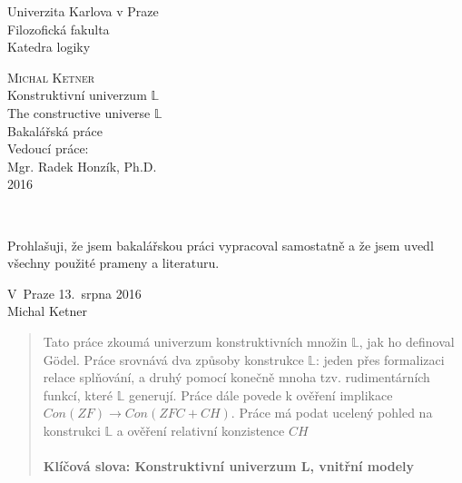 \documentclass[12pt,a4paper]{article}
\begin{document}
\begin{titlepage}
\Large
\begin{center}
Univerzita Karlova v Praze \\
Filozofick\'{a} fakulta \\
Katedra logiky

\vspace{8.5em}
\textsc{Michal Ketner}\\[1.4em]
{%
Konstruktivn\'{i} univerzum $\mathbb{L}$\\
The constructive universe $\mathbb{L}$\\}
Bakal\'{a}\v{r}sk\'{a} pr\'{a}ce\\[6.8em]
Vedouc\'{i} pr\'{a}ce: \\ Mgr. Radek Honz\'{i}k, Ph.D. \\[6.8em]
2016
\end{center}
\end{titlepage}\





\vspace{\fill}
\noindent Prohla\v{s}uji, \v{z}e jsem bakal\'{a}\v{r}skou pr\'{a}ci vypracoval samostatn\v{e} a \v{z}e jsem
uvedl  v\v{s}echny pou\v{z}it\'{e} prameny a literaturu.

\bigskip
\noindent V~Praze 13.~srpna 2016\\[3em]
\hspace*{\fill}Michal Ketner\hspace*{3em}
\clearpage

\begin{abstract}
\noindent Tato pr\'{a}ce zkoum\'{a} univerzum konstruktivn\'{i}ch mno\v{z}in $\mathbb{L}$, jak ho definoval G\"{o}del. Pr\'{a}ce srovn\'{a}v\'{a} dva zp\r{u}soby konstrukce $\mathbb{L}$: jeden p\v{r}es formalizaci relace spl\v{n}ov\'{a}n\'{i}, a druh\'{y} pomoc\'{i} kone\v{c}n\v{e} mnoha tzv. rudiment\'{a}rn\'{i}ch funkc\'{i}, kter\'{e} $\mathbb{L}$ generuj\'{i}. Pr\'{a}ce d\'{a}le povede k ov\v{e}\v{r}en\'{i} implikace $ Con(ZF) \rightarrow Con(ZFC + CH) $. Pr\'{a}ce m\'{a} podat ucelen\'{y} pohled na konstrukci $\mathbb{L}$ a ov\v{e}\v{r}en\'{i} relativn\'{i} konzistence $ CH $ 
\\
~\\
\textbf{Kl\'{i}\v{c}ov\'{a} slova: Konstruktivn\'{i} univerzum L, vnit\v{r}n\'{i} modely}
\end{abstract}
\end{document}
